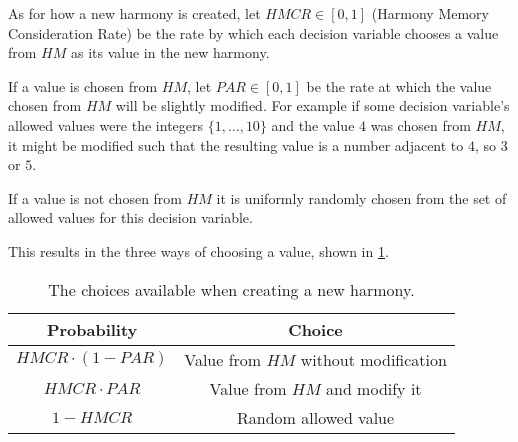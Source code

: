 As for how a new harmony is created, let $HMCR \in [0,1]$ (Harmony Memory Consideration Rate) be the rate by which each decision variable chooses a value from $HM$ as its value in the new harmony.

If a value is chosen from $HM$, let $PAR \in [0,1]$ be the rate at which the value chosen from $HM$ will be slightly modified.
For example if some decision variable's allowed values were the integers $\{1, \dots, 10\}$ and the value $4$ was chosen from $HM$, it might be modified such that the resulting value is a number adjacent to $4$, so $3$ or $5$.

If a value is not chosen from $HM$ it is uniformly randomly chosen from the set of allowed values for this decision variable.

This results in the three ways of choosing a value, shown in \cref{tab:04:hschoices}.

\begin{table}[t]
    \centering
    \begin{tabular}{|c|c|}\hline
        \textbf{Probability} & \textbf{Choice}\\ \hline
        $HMCR \cdot (1 - PAR)$ & Value from $HM$ without modification\\\hline
        $HMCR \cdot PAR$ & Value from $HM$ and modify it\\\hline
        $1 - HMCR$ & Random allowed value\\\hline 
    \end{tabular}
    \caption{The choices available when creating a new harmony.}
    \label{tab:04:hschoices}
\end{table}
